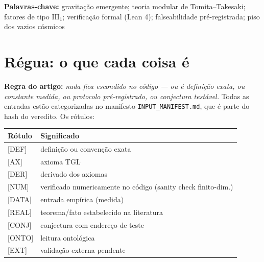 \documentclass[11pt]{article}
\theoremstyle{definition}\newtheorem{deriv}{Derivação}
\begin{document}
\noindent\textbf{Palavras-chave:} gravitação emergente; teoria modular de Tomita--Takesaki; fatores de tipo $\mathrm{III}_1$; verificação formal (Lean 4); falseabilidade pré-registrada; piso dos vazios cósmicos\par\vspace{4pt}

\clearpage\tableofcontents\clearpage

\section*{Régua: o que cada coisa é}

\noindent\textbf{Regra do artigo:} \emph{nada fica escondido no código --- ou é definição exata, ou constante medida, ou protocolo pré-registrado, ou conjectura testável.} Todas as entradas estão categorizadas no manifesto \texttt{INPUT\_MANIFEST.md}, que é parte do hash do veredito. Os rótulos:

\begin{center}\small\begin{tabular}{ll}\toprule

Rótulo & Significado\\\midrule

\textsf{[DEF]} & definição ou convenção exata\\

\textsf{[AX]} & axioma TGL\\

\textsf{[DER]} & derivado dos axiomas\\

\textsf{[NUM]} & verificado numericamente no código (sanity check finito-dim.)\\

\textsf{[DATA]} & entrada empírica (medida)\\

\textsf{[REAL]} & teorema/fato estabelecido na literatura\\

\textsf{[CONJ]} & conjectura com endereço de teste\\

\textsf{[ONTO]} & leitura ontológica\\

\textsf{[EXT]} & validação externa pendente\\\bottomrule

\end{tabular}\end{center}
\end{document}
